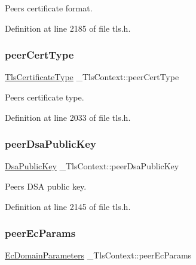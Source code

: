 Peer\textquotesingle{}s certificate format. 



Definition at line 2185 of file tls.\+h.

\mbox{\label{struct__TlsContext_a9b5f27d5321b90f2a874719b289996fa}} 
\subsubsection{\texorpdfstring{peer\+Cert\+Type}{peerCertType}}
{\footnotesize\ttfamily \hyperlink{tls_8h_a9bd45859e2bffbd3edb8beff07240ffd}{Tls\+Certificate\+Type} \+\_\+\+Tls\+Context\+::peer\+Cert\+Type}



Peer\textquotesingle{}s certificate type. 



Definition at line 2033 of file tls.\+h.

\mbox{\label{struct__TlsContext_a2b5974998c76bede5a7b7591c48be026}} 
\subsubsection{\texorpdfstring{peer\+Dsa\+Public\+Key}{peerDsaPublicKey}}
{\footnotesize\ttfamily \hyperlink{structDsaPublicKey}{Dsa\+Public\+Key} \+\_\+\+Tls\+Context\+::peer\+Dsa\+Public\+Key}



Peer\textquotesingle{}s D\+SA public key. 



Definition at line 2145 of file tls.\+h.

\mbox{\label{struct__TlsContext_aff3cbb8a3096cf4f7fe175600b8187ec}} 
\subsubsection{\texorpdfstring{peer\+Ec\+Params}{peerEcParams}}
{\footnotesize\ttfamily \hyperlink{structEcDomainParameters}{Ec\+Domain\+Parameters} \+\_\+\+Tls\+Context\+::peer\+Ec\+Params}



